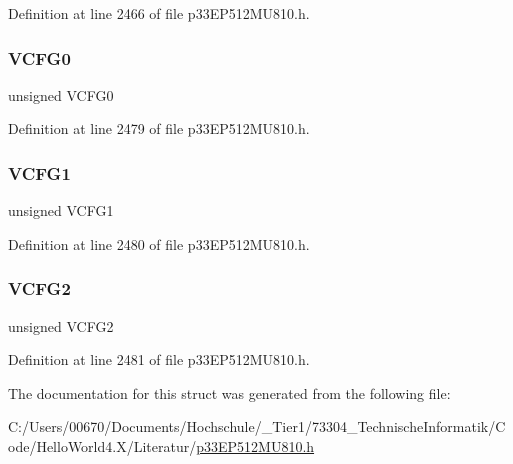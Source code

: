 Definition at line 2466 of file p33\+E\+P512\+M\+U810.\+h.

\mbox{\label{structtag_a_d1_c_o_n2_b_i_t_s_afb91efccb5c64031ed340b5f78a99568}} 
\subsubsection{\texorpdfstring{V\+C\+F\+G0}{VCFG0}}
{\footnotesize\ttfamily unsigned V\+C\+F\+G0}



Definition at line 2479 of file p33\+E\+P512\+M\+U810.\+h.

\mbox{\label{structtag_a_d1_c_o_n2_b_i_t_s_abdb5b9805fa4bb09217bb2b134565c1a}} 
\subsubsection{\texorpdfstring{V\+C\+F\+G1}{VCFG1}}
{\footnotesize\ttfamily unsigned V\+C\+F\+G1}



Definition at line 2480 of file p33\+E\+P512\+M\+U810.\+h.

\mbox{\label{structtag_a_d1_c_o_n2_b_i_t_s_ad26fd7d13c850437b5d14a6e95f47483}} 
\subsubsection{\texorpdfstring{V\+C\+F\+G2}{VCFG2}}
{\footnotesize\ttfamily unsigned V\+C\+F\+G2}



Definition at line 2481 of file p33\+E\+P512\+M\+U810.\+h.



The documentation for this struct was generated from the following file\+:\begin{DoxyCompactItemize}
\item 
C\+:/\+Users/00670/\+Documents/\+Hochschule/\+\_\+\+Tier1/73304\+\_\+\+Technische\+Informatik/\+Code/\+Hello\+World4.\+X/\+Literatur/\hyperlink{p33_e_p512_m_u810_8h}{p33\+E\+P512\+M\+U810.\+h}\end{DoxyCompactItemize}
